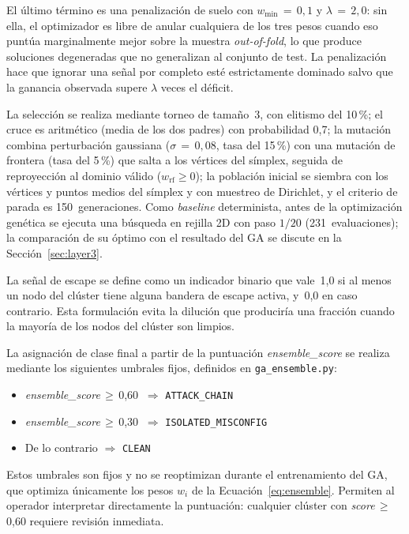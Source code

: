 El último término es una penalización de suelo con \(w_{\min}\,=\,0{,}1\) y
\(\lambda\,=\,2{,}0\): sin ella, el optimizador es libre de anular cualquiera de
los tres pesos cuando eso puntúa marginalmente mejor sobre la muestra
\textit{out-of-fold}, lo que produce soluciones degeneradas que no generalizan al
conjunto de test. La penalización hace que ignorar una señal por completo esté
estrictamente dominado salvo que la ganancia observada supere \(\lambda\) veces el
déficit.

La selección se realiza mediante torneo de tamaño~3, con elitismo del 10\,\%; el cruce
es aritmético (media de los dos padres) con probabilidad 0,7; la mutación combina
perturbación gaussiana (\(\sigma\,=\,0{,}08\), tasa del 15\,\%) con una mutación de
frontera (tasa del 5\,\%) que salta a los vértices del símplex, seguida de
reproyección al dominio válido (\(w_{\text{rf}} \geq 0\)); la población inicial se
siembra con los vértices y puntos medios del símplex y con muestreo de Dirichlet, y el
criterio de parada es 150~generaciones.
Como \textit{baseline} determinista, antes de la optimización genética se
ejecuta una búsqueda en rejilla 2D con paso \(1/20\) (231~evaluaciones); la
comparación de su óptimo con el resultado del \ac{GA} se discute en la
Sección~\ref{sec:layer3}.

La señal de escape se define como un indicador binario que vale~1,0 si al menos un
nodo del clúster tiene alguna bandera de escape activa, y~0,0 en caso contrario. Esta
formulación evita la dilución que produciría una fracción cuando la mayoría de los
nodos del clúster son limpios.

La asignación de clase final a partir de la puntuación \textit{ensemble\_score}
se realiza mediante los siguientes umbrales fijos, definidos en
\texttt{ga\_ensemble.py}:
\begin{itemize}
  \item \textit{ensemble\_score}\,\(\geq\)\,0,60 \(\ \Rightarrow\) \texttt{ATTACK\_CHAIN}
  \item \textit{ensemble\_score}\,\(\geq\)\,0,30 \(\ \Rightarrow\) \texttt{ISOLATED\_MISCONFIG}
  \item De lo contrario \(\Rightarrow\) \texttt{CLEAN}
\end{itemize}
Estos umbrales son fijos y no se reoptimizan durante el entrenamiento del \ac{GA},
que optimiza únicamente los pesos \(w_i\) de la Ecuación~\ref{eq:ensemble}.
Permiten al operador interpretar directamente la puntuación: cualquier clúster con
\textit{score}\,\(\geq\)\,0,60 requiere revisión inmediata.

